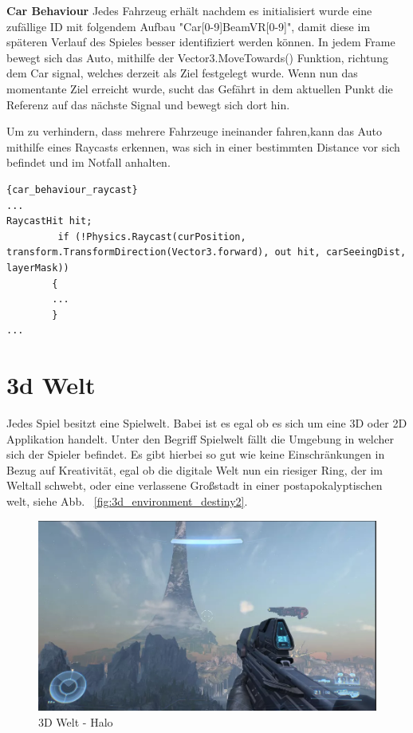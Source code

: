\textbf{Car Behaviour}
Jedes Fahrzeug erh\"alt nachdem es initialisiert wurde eine zufällige ID mit folgendem Aufbau "Car[0-9]BeamVR[0-9]", damit diese im sp\"ateren Verlauf des Spieles besser identifiziert werden können.
In jedem Frame bewegt sich das Auto, mithilfe der Vector3.MoveTowards() Funktion, richtung dem Car signal, welches derzeit als Ziel festgelegt wurde.
Wenn nun das momentante Ziel erreicht wurde, sucht das Gefährt in dem aktuellen Punkt die Referenz auf das nächste Signal und bewegt sich dort hin.

Um zu verhindern, dass mehrere Fahrzeuge ineinander fahren,kann das Auto mithilfe eines Raycasts erkennen, was sich in einer bestimmten Distance vor sich befindet und im Notfall anhalten.

\begin{lstlisting}{car_behaviour_raycast}
...
RaycastHit hit;
         if (!Physics.Raycast(curPosition, transform.TransformDirection(Vector3.forward), out hit, carSeeingDist, layerMask))
        {
        ...
        }
...
\end{lstlisting}

\section{3d Welt}\label{sec:3d-world}
Jedes Spiel besitzt eine Spielwelt.
Babei ist es egal ob es sich um eine 3D oder 2D Applikation handelt.
Unter den Begriff Spielwelt fällt die Umgebung in welcher sich der Spieler befindet.
Es gibt hierbei so gut wie keine Einschränkungen in Bezug auf Kreativität, egal ob die digitale Welt nun ein riesiger Ring, der im Weltall schwebt,
oder eine verlassene Großstadt in einer postapokalyptischen welt, siehe Abb. ~\ref{fig:3d_environment_destiny2}.
~\cite{GamesRadar_HaloRing_2022}




\begin{figure}
    \centering
    \includegraphics[scale=0.4]{pics/3d_welt_halo_ring}
    \caption{3D Welt - Halo}
    \label{fig:3d_environment_halo}
\end{figure}


